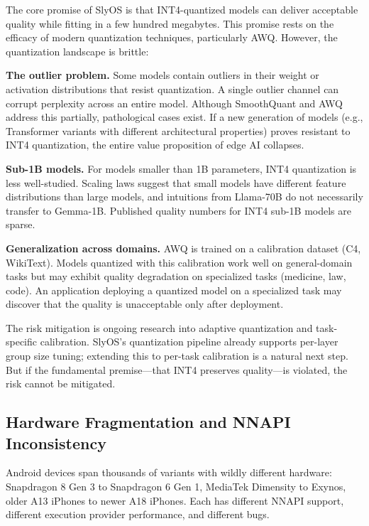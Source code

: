 \documentclass[12pt, letterpaper, twoside]{report}
\begin{document}
The core promise of SlyOS is that INT4-quantized models can deliver acceptable quality while fitting in a few hundred megabytes. This promise rests on the efficacy of modern quantization techniques, particularly AWQ. However, the quantization landscape is brittle:

\textbf{The outlier problem.} Some models contain outliers in their weight or activation distributions that resist quantization. A single outlier channel can corrupt perplexity across an entire model. Although SmoothQuant and AWQ address this partially, pathological cases exist. If a new generation of models (e.g., Transformer variants with different architectural properties) proves resistant to INT4 quantization, the entire value proposition of edge AI collapses.

\textbf{Sub-1B models.} For models smaller than 1B parameters, INT4 quantization is less well-studied. Scaling laws suggest that small models have different feature distributions than large models, and intuitions from Llama-70B do not necessarily transfer to Gemma-1B. Published quality numbers for INT4 sub-1B models are sparse.

\textbf{Generalization across domains.} AWQ is trained on a calibration dataset (C4, WikiText). Models quantized with this calibration work well on general-domain tasks but may exhibit quality degradation on specialized tasks (medicine, law, code). An application deploying a quantized model on a specialized task may discover that the quality is unacceptable only after deployment.

The risk mitigation is ongoing research into adaptive quantization and task-specific calibration. SlyOS's quantization pipeline already supports per-layer group size tuning; extending this to per-task calibration is a natural next step. But if the fundamental premise---that INT4 preserves quality---is violated, the risk cannot be mitigated.

\subsection{Hardware Fragmentation and NNAPI Inconsistency}
\label{subsec:hardware_fragmentation}

Android devices span thousands of variants with wildly different hardware: Snapdragon 8 Gen 3 to Snapdragon 6 Gen 1, MediaTek Dimensity to Exynos, older A13 iPhones to newer A18 iPhones. Each has different NNAPI support, different execution provider performance, and different bugs.
\end{document}
